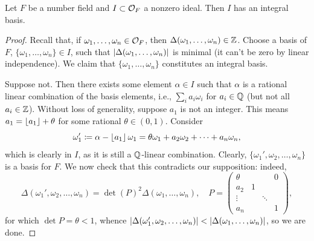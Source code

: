 \begin{proposition} \label{prop:existence_of_integral_basis}
    Let $F$ be a number field and $I \subset \mathcal O_F$ a nonzero ideal. Then $I$ has an integral basis.
\end{proposition}
\begin{proof}
    Recall that, if $\omega_1, \dots, \omega_n \in \mathcal O_F$, then $\Delta(\omega_1, \dots, \omega_n) \in \mathbb Z$. Choose a basis of $F$, $\{\omega_1, \dots, \omega_n\} \in I$, such that $\left\lvert \Delta(\omega_1, \dots, \omega_n) \right\rvert$ is minimal (it can't be zero by linear independence). We claim that $\{\omega_1, \dots, \omega_n\}$ constitutes an integral basis.

    Suppose not. Then there exists some element $\alpha \in I$ such that $\alpha$ is a rational linear combination of the basis elements, i.e., $\sum_i a_i \omega_i$ for $a_i \in \mathbb Q$ (but not all $a_i \in \mathbb Z$). Without loss of generality, suppose $a_1$ is not an integer. This means $a_1 = \left\lfloor a_1 \right\rfloor + \theta$ for some rational $\theta \in (0, 1)$. Consider
    \[ \omega_1' \coloneq \alpha - \left\lfloor a_1 \right\rfloor \omega_1 = \theta \omega_1 + a_2 \omega_2 + \dots + a_n \omega_n, \]
    which is clearly in $I$, as it is still a $\mathbb Q$-linear combination. Clearly, $\{\omega_1', \omega_2, \dots, \omega_n\}$ is a basis for $F$. We now check that this contradicts our supposition: indeed,
    \[ \Delta(\omega_1', \omega_2, \dots, \omega_n) = \det(P)^2 \Delta(\omega_1, \dots, \omega_n), \quad P = \left(\!\!\begin{array}{c|ccc} \theta & & & 0 \\ a_2 & 1 \\ \vdots & & \ddots \\ a_n & & & 1 \end{array}\right), \]
    for which $\det P = \theta < 1$, whence $\left\lvert \Delta(\omega_1', \omega_2, \dots, \omega_n) \right\rvert < \left\lvert \Delta(\omega_1, \dots, \omega_n) \right\rvert$, so we are done.
\end{proof}

